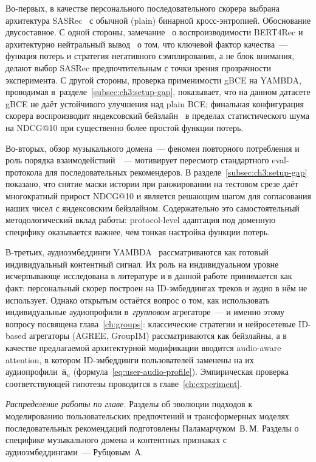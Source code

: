 Во-первых, в качестве персонального последовательного скорера выбрана архитектура SASRec~\cite{sasrec2018} с обычной (plain) бинарной кросс-энтропией. Обоснование двусоставное. С одной стороны, замечание~\cite{petrov2022bert4rec_replicability} о воспроизводимости BERT4Rec и архитектурно нейтральный вывод~\cite{gsasrec2023} о том, что ключевой фактор качества~--- функция потерь и стратегия негативного сэмплирования, а не блок внимания, делают выбор SASRec предпочтительным с точки зрения прозрачности эксперимента. С другой стороны, проверка применимости gBCE на YAMBDA, проводимая в~разделе~\ref{subsec:ch3:setup-gap}, показывает, что на данном датасете gBCE не даёт устойчивого улучшения над plain BCE; финальная конфигурация скорера воспроизводит яндексовский бейзлайн~\cite{yambda2025} в пределах статистического шума на NDCG@10 при существенно более простой функции потерь.

Во-вторых, обзор музыкального домена~--- феномен повторного потребления и роль порядка взаимодействий~\cite{abbattista2024sequential, greer2025beyond}~--- мотивирует пересмотр стандартного eval-протокола для последовательных рекомендеров. В разделе~\ref{subsec:ch3:setup-gap} показано, что снятие маски истории при ранжировании на тестовом срезе даёт многократный прирост NDCG@10 и является решающим шагом для согласования наших чисел с яндексовским бейзлайном. Содержательно это самостоятельный методологический вклад работы: protocol-level адаптация под доменную специфику оказывается важнее, чем тонкая настройка функции потерь.

В-третьих, аудиоэмбеддинги YAMBDA~\cite{vandeoord2013deep_music, yambda2025} рассматриваются как готовый индивидуальный контентный сигнал. Их роль на индивидуальном уровне исчерпывающе исследована в литературе и в данной работе принимается как факт: персональный скорер построен на ID-эмбеддингах треков и аудио в нём не использует. Однако открытым остаётся вопрос о том, как использовать индивидуальные аудиопрофили в~\emph{групповом} агрегаторе~--- и именно этому вопросу посвящена глава~\ref{ch:groups}: классические стратегии и нейросетевые ID-based агрегаторы (AGREE, GroupIM) рассматриваются как бейзлайны, а в качестве предлагаемой архитектурной модификации вводится audio-aware attention, в котором ID-эмбеддинги пользователей заменены на их аудиопрофили~$\bar{\mathbf{a}}_u$ (формула~\eqref{eq:user-audio-profile}). Эмпирическая проверка соответствующей гипотезы проводится в главе~\ref{ch:experiment}.

\textit{Распределение работы по главе.} Разделы об эволюции подходов к моделированию пользовательских предпочтений и трансформерных моделях последовательных рекомендаций подготовлены Паламарчуком~В.\,М. Разделы о специфике музыкального домена и контентных признаках с аудиоэмбеддингами~--- Рубцовым~А.
